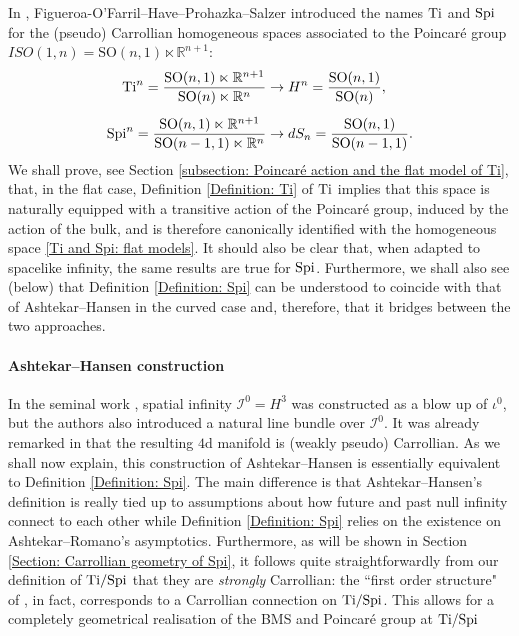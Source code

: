 \documentclass[a4paper, 10pt]{article}
\theoremstyle{remark}
\newcommand{\Ti}{\textnormal{Ti}}
\newcommand{\Spi}{\textnormal{Spi}}
\begin{document}
In \cite{Figueroa-OFarrill:2021sxz}, Figueroa-O'Farril--Have--Prohazka--Salzer introduced the names $\Ti$ and $\Spi$ for the (pseudo) Carrollian homogeneous spaces associated to the Poincaré group $ISO(1,n) = \textrm{SO}(n,1) \ltimes \mathbb{R}^{n+1}$:
\begin{align}\label{Ti and Spi: flat models}
\begin{alignedat}{2}
        \Ti^{n} = \frac{\textrm{SO}(n,1) \ltimes \mathbb{R}^{n+1}}{ \textrm{SO}(n) \ltimes \mathbb{R}^{n}} &\to  H^n = \frac{\textrm{SO}(n,1) }{ \textrm{SO}(n)},\\[0.5em]
        \Spi^{n} = \frac{\textrm{SO}(n,1) \ltimes \mathbb{R}^{n+1}}{ \textrm{SO}(n-1,1) \ltimes \mathbb{R}^{n}} &\to  dS_n = \frac{\textrm{SO}(n,1) }{ \textrm{SO}(n-1,1)}.
\end{alignedat}
\end{align}
We shall prove, see Section \ref{subsection: Poincaré action and the flat model of Ti}, that, in the flat case, Definition \ref{Definition: Ti} of $\Ti$ implies that this space is naturally equipped with a transitive action of the Poincaré group, induced by the action of the bulk, and is therefore canonically identified with the homogeneous space \eqref{Ti and Spi: flat models}. It should also be clear that, when adapted to spacelike infinity, the same results are true for $\Spi$. Furthermore, we shall also see (below) that Definition \ref{Definition: Spi} can be understood to coincide with that of Ashtekar--Hansen \cite{ashtekar_unified_1978} in the curved case and, therefore, that it bridges between the two approaches.

\paragraph{Ashtekar--Hansen construction}\mbox{}

In the seminal work \cite{ashtekar_unified_1978}, spatial infinity $\mathcal{I}^0=H^3$ was constructed as a blow up of $\iota^0$, but the authors also introduced a natural line bundle over $\mathcal{I}^0$. It was already remarked in \cite{gibbons_ashtekar-hansen_2019} that the resulting $4$d manifold is (weakly pseudo) Carrollian. As we shall now explain, this construction of Ashtekar--Hansen is essentially equivalent to Definition \ref{Definition: Spi}. The main difference is that Ashtekar--Hansen's definition is really tied up to assumptions about how future and past null infinity connect to each other while Definition \ref{Definition: Spi} relies on the existence on Ashtekar--Romano's asymptotics. Furthermore, as will be shown in Section \ref{Section: Carrollian geometry of Spi}, it follows quite straightforwardly from our definition of $\Ti/\Spi$ that they are \emph{strongly} Carrollian: the ``first order structure" of \cite{ashtekar_unified_1978,Ashtekar:1991vb}, in fact, corresponds to a Carrollian connection on $\Ti/\Spi$. This allows for a completely geometrical realisation of the BMS and Poincaré group at $\Ti / \Spi$
\end{document}
